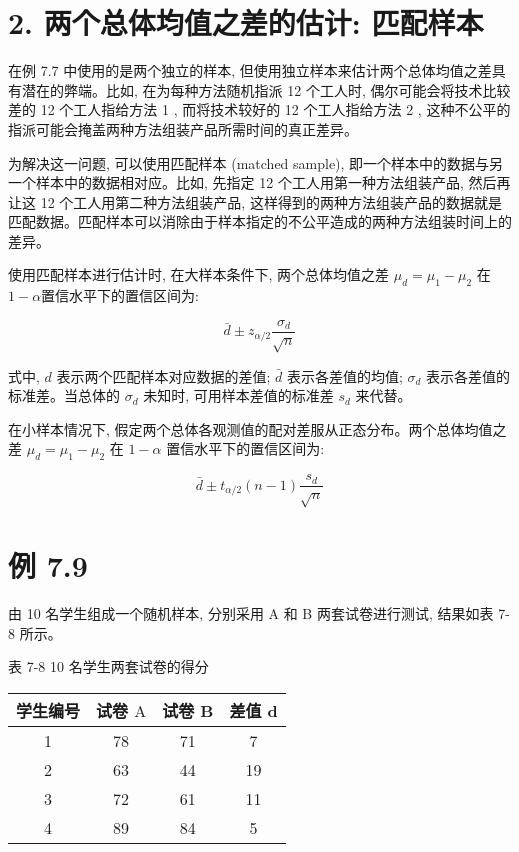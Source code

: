 \documentclass[10pt]{article}
\begin{document}
\begin{CJK*}{UTF8}{bsmi}
\section*{2. 两个总体均值之差的估计: 匹配样本}
在例 7.7 中使用的是两个独立的样本, 但使用独立样本来估计两个总体均值之差具有潜在的弊端。比如, 在为每种方法随机指派 12 个工人时, 偶尔可能会将技术比较差的 12 个工人指给方法 1 , 而将技术较好的 12 个工人指给方法 2 , 这种不公平的指派可能会掩盖两种方法组装产品所需时间的真正差异。

为解决这一问题, 可以使用匹配样本 (matched sample), 即一个样本中的数据与另一个样本中的数据相对应。比如, 先指定 12 个工人用第一种方法组装产品, 然后再让这 12 个工人用第二种方法组装产品, 这样得到的两种方法组装产品的数据就是匹配数据。匹配样本可以消除由于样本指定的不公平造成的两种方法组装时间上的差异。

使用匹配样本进行估计时, 在大样本条件下, 两个总体均值之差 $\mu_{d}=\mu_{1}-\mu_{2}$ 在 $1-\alpha$置信水平下的置信区间为:


\begin{equation*}
\bar{d} \pm z_{\alpha / 2} \frac{\sigma_{d}}{\sqrt{n}} \tag{7.20}
\end{equation*}


式中, $d$ 表示两个匹配样本对应数据的差值; $\bar{d}$ 表示各差值的均值; $\sigma_{d}$ 表示各差值的标准差。当总体的 $\sigma_{d}$ 未知时, 可用样本差值的标准差 $s_{d}$ 来代替。

在小样本情况下, 假定两个总体各观测值的配对差服从正态分布。两个总体均值之差 $\mu_{d}=\mu_{1}-\mu_{2}$ 在 $1-\alpha$ 置信水平下的置信区间为:


\begin{equation*}
\bar{d} \pm t_{\alpha / 2}(n-1) \frac{s_{d}}{\sqrt{n}} \tag{7.21}
\end{equation*}


\section*{例 7.9}
由 10 名学生组成一个随机样本, 分别采用 A 和 B 两套试卷进行测试, 结果如表 7-8 所示。

表 7-8 10 名学生两套试卷的得分

\begin{center}
\begin{tabular}{cccc}
\hline
学生编号 & 试卷 $\mathrm{A}$ & 试卷 B & 差值 $\boldsymbol{d}$ \\
\hline
1 & 78 & 71 & 7 \\
2 & 63 & 44 & 19 \\
3 & 72 & 61 & 11 \\
4 & 89 & 84 & 5 \\
\hline
\end{tabular}
\end{center}


\end{CJK*}
\end{document}
